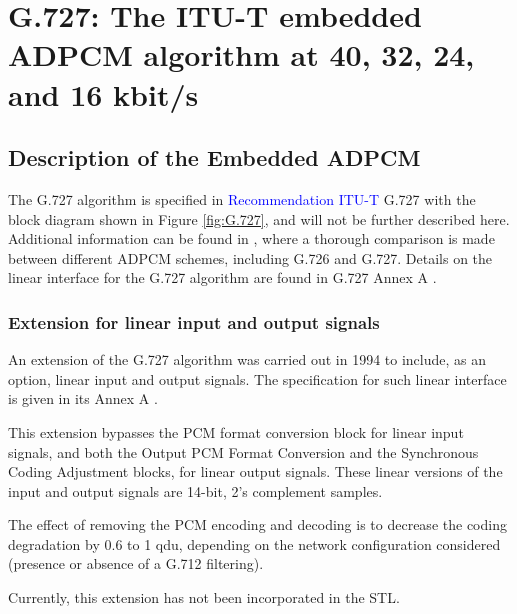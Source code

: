 \chapter{G.727: The ITU-T embedded ADPCM algorithm at
         40, 32, 24, and 16 kbit/s}



\section{Description of the Embedded ADPCM}

The G.727 algorithm is specified in \textcolor{blue}{Recommendation
  ITU-T} G.727
\cite{G.727} with the block diagram shown in Figure \ref{fig:G.727},
and will not be further described here. Additional information can be
found in \cite{ADPCM-Tech-Report}, where a thorough comparison is made
between different ADPCM schemes, including G.726 and G.727. Details on
the linear interface for the G.727 algorithm are found in G.727 Annex
A \cite{G.727:LinearIO}.


\subsection{Extension for linear input and output signals}

An extension of the G.727 algorithm was carried out in 1994 to include, as
an option, linear input and output signals. The specification for such linear
interface is given in its Annex A \cite{G.727:LinearIO}.

This extension bypasses the PCM format conversion block for linear input
signals, and both the Output PCM Format Conversion and the Synchronous
Coding Adjustment blocks, for linear output signals. These linear versions
of the input and output signals are 14-bit, 2's complement samples.

The effect of removing the PCM encoding and decoding is to decrease the
coding degradation by 0.6 to 1 qdu, depending on the network configuration
considered (presence or absence of a G.712 filtering).

Currently, this extension has not been incorporated in the STL.

